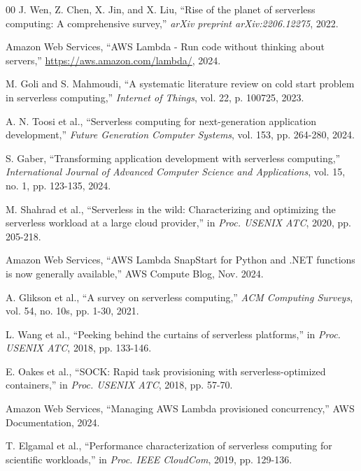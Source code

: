 \documentclass[conference]{IEEEtran}
\begin{document}
\begin{thebibliography}{00}
 J. Wen, Z. Chen, X. Jin, and X. Liu, ``Rise of the planet of serverless computing: A comprehensive survey,'' \textit{arXiv preprint arXiv:2206.12275}, 2022.

 Amazon Web Services, ``AWS Lambda - Run code without thinking about servers,'' \url{https://aws.amazon.com/lambda/}, 2024.

 M. Goli and S. Mahmoudi, ``A systematic literature review on cold start problem in serverless computing,'' \textit{Internet of Things}, vol. 22, p. 100725, 2023.

 A. N. Toosi et al., ``Serverless computing for next-generation application development,'' \textit{Future Generation Computer Systems}, vol. 153, pp. 264-280, 2024.

 S. Gaber, ``Transforming application development with serverless computing,'' \textit{International Journal of Advanced Computer Science and Applications}, vol. 15, no. 1, pp. 123-135, 2024.

 M. Shahrad et al., ``Serverless in the wild: Characterizing and optimizing the serverless workload at a large cloud provider,'' in \textit{Proc. USENIX ATC}, 2020, pp. 205-218.

 Amazon Web Services, ``AWS Lambda SnapStart for Python and .NET functions is now generally available,'' AWS Compute Blog, Nov. 2024.

 A. Glikson et al., ``A survey on serverless computing,'' \textit{ACM Computing Surveys}, vol. 54, no. 10s, pp. 1-30, 2021.

 L. Wang et al., ``Peeking behind the curtains of serverless platforms,'' in \textit{Proc. USENIX ATC}, 2018, pp. 133-146.

 E. Oakes et al., ``SOCK: Rapid task provisioning with serverless-optimized containers,'' in \textit{Proc. USENIX ATC}, 2018, pp. 57-70.

 Amazon Web Services, ``Managing AWS Lambda provisioned concurrency,'' AWS Documentation, 2024.

 T. Elgamal et al., ``Performance characterization of serverless computing for scientific workloads,'' in \textit{Proc. IEEE CloudCom}, 2019, pp. 129-136.


\end{thebibliography}
\end{document}
